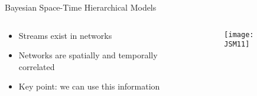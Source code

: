 \documentclass{beamer}
\begin{document}
\begin{frame}{Bayesian Space-Time Hierarchical Models}{}

     \begin{columns}[T] 
	     \begin{column}[T]{5cm} 

\begin{itemize}
\item Streams exist in networks
\item Networks are spatially and temporally correlated
\item Key point: we can use this information
\end{itemize}

	     \end{column}
	     \begin{column}[T]{5cm} 

\begin{figure}[H]
\texttt{[image: JSM11]}
\end{figure}

	     \end{column}
     \end{columns}

\end{frame}





\end{document}
